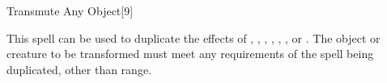 \begin{spellsection}{Transmute Any Object}[9]
    \begin{spellheader}
    \end{spellheader}
    \begin{spellcontent}
        \begin{spelltargetinginfo}
            \spellrng{\rngmed}
        \end{spelltargetinginfo}
        \begin{spelleffects}
            \spellspecial This spell can be used to duplicate the effects of , , , , , , or . The object or creature to be transformed must meet any requirements of the spell being duplicated, other than range.
        \end{spelleffects}
    \end{spellcontent}
    \begin{spellfooter}
        \miscastexplode
    \end{spellfooter}
\end{spellsection}

